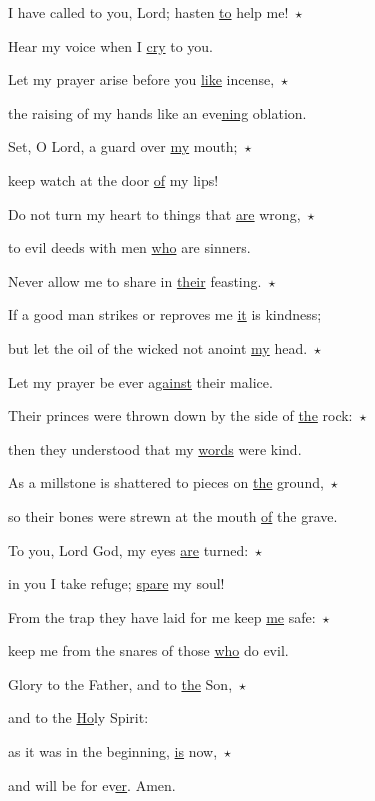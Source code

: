 \noindent I have called to you, Lord; hasten \uline{to} help me!~$\star$~\nopagebreak

Hear my voice when I \uline{cry} to you.

\noindent Let my prayer arise before you \uline{like} incense,~$\star$~\nopagebreak

the raising of my hands like an eve\uline{ning} oblation.

\noindent Set, O Lord, a guard over \uline{my} mouth;~$\star$~\nopagebreak

keep watch at the door \uline{of} my lips!

\noindent Do not turn my heart to things that \uline{are} wrong,~$\star$~\nopagebreak

to evil deeds with men \uline{who} are sinners.

\noindent Never allow me to share in \uline{their} feasting.~$\star$~\nopagebreak

If a good man strikes or reproves me \uline{it} is kindness;

\noindent but let the oil of the wicked not anoint \uline{my} head.~$\star$~\nopagebreak

Let my prayer be ever a\uline{gainst} their malice.

\noindent Their princes were thrown down by the side of \uline{the} rock:~$\star$~\nopagebreak

then they understood that my \uline{words} were kind.

\noindent As a millstone is shattered to pieces on \uline{the} ground,~$\star$~\nopagebreak

so their bones were strewn at the mouth \uline{of} the grave.

\noindent To you, Lord God, my eyes \uline{are} turned:~$\star$~\nopagebreak

in you I take refuge; \uline{spare} my soul!

\noindent From the trap they have laid for me keep \uline{me} safe:~$\star$~\nopagebreak

keep me from the snares of those \uline{who} do evil.

\noindent Glory to the Father, and to \uline{the} Son,~$\star$~\nopagebreak

and to the \uline{Ho}ly Spirit:

\noindent as it was in the beginning, \uline{is} now,~$\star$~\nopagebreak

and will be for ev\uline{er}. Amen.